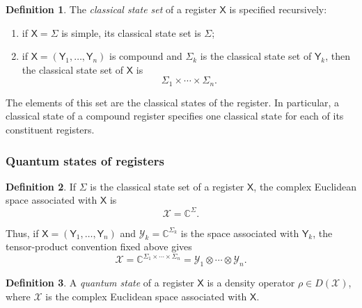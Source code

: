 \documentclass[
    aps,
    pra,
    reprint,
    superscriptaddress,
    nofootinbib
]{revtex4-2}
\theoremstyle{definition}
\newtheorem{definition}{Definition}[section]
\theoremstyle{plain}
\begin{document}
\begin{definition}
    The \emph{classical state set} of a register $\mathsf{X}$ is specified
    recursively:
    \begin{enumerate}
        \item if $\mathsf{X}=\Sigma$ is simple, its classical state set is
        $\Sigma$;
        \item if
        $\mathsf{X}=(\mathsf{Y}_1,\ldots,\mathsf{Y}_n)$ is compound and
        $\Sigma_k$ is the classical state set of $\mathsf{Y}_k$, then the
        classical state set of $\mathsf{X}$ is
        \begin{equation}
            \Sigma_1\times\cdots\times\Sigma_n.
        \end{equation}
    \end{enumerate}
\end{definition}

The elements of this set are the classical states of the register. In
particular, a classical state of a compound register specifies one classical
state for each of its constituent registers.

\subsubsection{Quantum states of registers}
\label{sec:quantum-state}

\begin{definition}
    If $\Sigma$ is the classical state set of a register $\mathsf{X}$, the
    complex Euclidean space associated with $\mathsf{X}$ is
    \begin{equation}
        \mathcal{X}=\mathbb{C}^{\Sigma}.
    \end{equation}
\end{definition}

Thus, if
$\mathsf{X}=(\mathsf{Y}_1,\ldots,\mathsf{Y}_n)$ and
$\mathcal{Y}_k=\mathbb{C}^{\Sigma_k}$ is the space associated with
$\mathsf{Y}_k$, the tensor-product convention fixed above gives
\begin{equation}
    \mathcal{X}
    =
    \mathbb{C}^{\Sigma_1\times\cdots\times\Sigma_n}
    =
    \mathcal{Y}_1\otimes\cdots\otimes\mathcal{Y}_n.
\end{equation}

\begin{definition}
    A \emph{quantum state} of a register $\mathsf{X}$ is a density operator
    $\rho\in D(\mathcal{X})$, where $\mathcal{X}$ is the complex Euclidean
    space associated with $\mathsf{X}$.
\end{definition}
\end{document}
